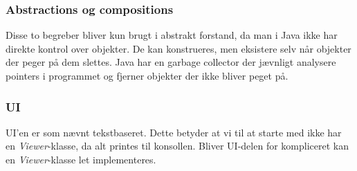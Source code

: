 \subsubsection{Abstractions og compositions}
Disse to begreber bliver kun brugt i abstrakt forstand, da man i Java ikke har direkte kontrol over objekter. De kan konstrueres, men eksistere selv når objekter der peger på dem slettes. Java har en garbage collector der jævnligt analysere pointers i programmet og fjerner objekter der ikke bliver peget på.
\subsubsection{UI}
UI'en er som nævnt tekstbaseret. Dette betyder at vi til at starte med ikke har en \emph{Viewer}-klasse, da alt printes til konsollen. Bliver UI-delen for kompliceret kan en \emph{Viewer}-klasse let implementeres.
\newpage